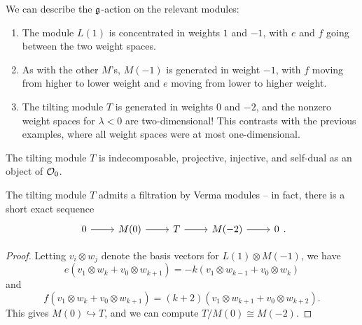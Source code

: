 \documentclass{article}
\begin{document}
\begin{ex}
	We can describe the $\mathfrak{g}$-action on the relevant modules:
	\begin{enumerate}
		\item The module $L(1)$ is concentrated in weights $1$ and $-1$, with $e$ and $f$ going between the two weight spaces.
		\item As with the other $M$'s, $M(-1)$ is generated in weight $-1$, with $f$ moving from higher to lower weight and $e$ moving from lower to higher weight.
		\item The tilting module $T$ is generated in weights $0$ and $-2$, and the nonzero weight spaces for $\lambda < 0$ are two-dimensional!
			This contrasts with the previous examples, where all weight spaces were at most one-dimensional.
	\end{enumerate}
\end{ex}

\begin{prop}
	The tilting module $T$ is indecomposable, projective, injective, and self-dual as an object of $\mathcal{O}_0$.
\end{prop}

\begin{prop}
	The tilting module $T$ admits a filtration by Verma modules -- in fact, there is a short exact sequence
	\[
		\SES{M(0)}{T}{M(-2)}.
	\]
\end{prop}

\begin{proof}
	Letting $v_i \otimes w_j$ denote the basis vectors for $L(1) \otimes M(-1)$, we have
	\[
		e(v_1 \otimes w_k + v_0 \otimes w_{k+1}) = -k (v_1 \otimes w_{k-1} + v_0 \otimes w_k)
	\]
	and
	\[
		f(v_1 \otimes w_k + v_0 \otimes w_{k+1}) = (k+2) (v_1 \otimes w_{k+1} + v_0 \otimes w_{k+2}).
	\]
	This gives $M(0) \hookrightarrow T$, and we can compute $T / M(0) \cong M(-2)$.
\end{proof}
\end{document}
